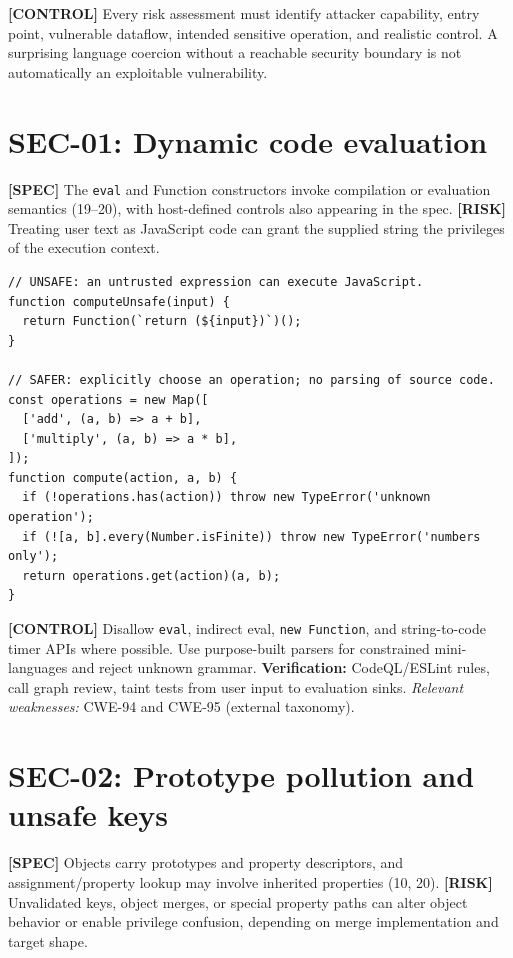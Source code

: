\documentclass[11pt,letterpaper]{article}
\newcommand{\passthrough}[1]{#1}
\begin{document}
\textbf{{[}CONTROL{]}} Every risk assessment must identify attacker capability, entry point, vulnerable dataflow, intended sensitive operation, and realistic control. A surprising language coercion without a reachable security boundary is not automatically an exploitable vulnerability.

\section{SEC-01: Dynamic code evaluation}\label{sec-01-dynamic-code-evaluation}

\textbf{{[}SPEC{]}} The \passthrough{\lstinline!eval!} and Function constructors invoke compilation or evaluation semantics (19--20), with host-defined controls also appearing in the spec. \textbf{{[}RISK{]}} Treating user text as JavaScript code can grant the supplied string the privileges of the execution context.

\begin{lstlisting}
// UNSAFE: an untrusted expression can execute JavaScript.
function computeUnsafe(input) {
  return Function(`return (${input})`)();
}

// SAFER: explicitly choose an operation; no parsing of source code.
const operations = new Map([
  ['add', (a, b) => a + b],
  ['multiply', (a, b) => a * b],
]);
function compute(action, a, b) {
  if (!operations.has(action)) throw new TypeError('unknown operation');
  if (![a, b].every(Number.isFinite)) throw new TypeError('numbers only');
  return operations.get(action)(a, b);
}
\end{lstlisting}

\textbf{{[}CONTROL{]}} Disallow \passthrough{\lstinline!eval!}, indirect eval, \passthrough{\lstinline!new Function!}, and string-to-code timer APIs where possible. Use purpose-built parsers for constrained mini-languages and reject unknown grammar. \textbf{Verification:} CodeQL/ESLint rules, call graph review, taint tests from user input to evaluation sinks. \emph{Relevant weaknesses:} CWE-94 and CWE-95 (external taxonomy).

\section{SEC-02: Prototype pollution and unsafe keys}\label{sec-02-prototype-pollution-and-unsafe-keys}

\textbf{{[}SPEC{]}} Objects carry prototypes and property descriptors, and assignment/property lookup may involve inherited properties (10, 20). \textbf{{[}RISK{]}} Unvalidated keys, object merges, or special property paths can alter object behavior or enable privilege confusion, depending on merge implementation and target shape.
\end{document}
